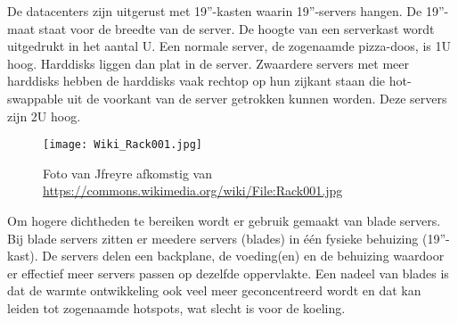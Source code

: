 De datacenters zijn uitgerust met 19''-kasten waarin 19''-servers hangen. De 19''-maat staat voor de breedte van de server. De hoogte van een serverkast wordt uitgedrukt in het aantal U. Een normale server, de zogenaamde pizza-doos, is 1U hoog. Harddisks liggen dan plat in de server. Zwaardere servers met meer harddisks hebben de harddisks vaak rechtop op hun zijkant staan die hot-swappable uit de voorkant van de server getrokken kunnen worden. Deze servers zijn 2U hoog.

\begin{figure}[H]
\texttt{[image: Wiki\_Rack001.jpg]}
	\caption{Foto van Jfreyre afkomstig van \url{https://commons.wikimedia.org/wiki/File:Rack001.jpg}}
\centering
\end{figure}

Om hogere dichtheden te bereiken wordt er gebruik gemaakt van blade servers. Bij blade servers zitten er meedere servers (blades) in \'e\'en fysieke behuizing (19''-kast). De servers delen een backplane, de voeding(en) en de behuizing waardoor er effectief meer servers passen op dezelfde oppervlakte. Een nadeel van blades is dat de warmte ontwikkeling ook veel meer geconcentreerd wordt en dat kan leiden tot zogenaamde hotspots, wat slecht is voor de koeling.
